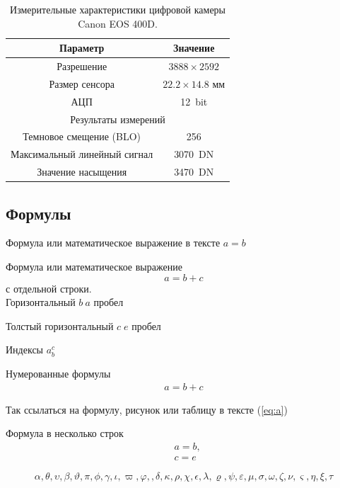 \begin{table}[h]
	\caption{\label{tab:canonsummary}Измерительные характеристики цифровой камеры Canon EOS 400D.} %
	\begin{center}%
		\begin{tabular}{|c|c|} %
			\hline %
			Параметр 		& 		Значение \\
			\hline
			Разрешение		 & $3888 \times 2592$ \\
			Размер сенсора	 & $22.2 \times 14.8$ мм \\
			АЦП & 12~bit\\
			\hline
			\multicolumn{2}{|c|}{Результаты измерений} \\ %
			\hline
			Темновое смещение (BLO) & 256 \\
			Максимальный линейный сигнал & 3070~DN \\
			Значение насыщения & 3470~DN \\
			\hline
		\end{tabular}
	\end{center}
\end{table}


\subsection{Формулы}
Формула или математическое выражение в тексте $a=b$

Формула или математическое выражение
$$
a=b+c
$$
с отдельной строки.\\

Горизонтальный $b\: a$ пробел

Толстый горизонтальный $c\;e$ пробел

Индексы $a_b^c$

Нумерованные формулы
\begin{eqnarray}
\label{eq:a}%
a=b+c
\end{eqnarray}

Так ссылаться на формулу, рисунок или таблицу в тексте (\ref{eq:a})

Формула в несколько строк
\begin{eqnarray*}
\label{new_formula}
&a=b,\\
&c=e
\end{eqnarray*}

$$
\alpha,  \theta, \upsilon, \beta, \vartheta, \pi, \phi, \gamma, \iota, \varpi, \varphi,
, \delta , \kappa , \rho , \chi
, \epsilon , \lambda , \varrho , \psi
, \varepsilon , \mu , \sigma , \omega
, \zeta , \nu , \varsigma
, \eta, \xi , \tau
$$

